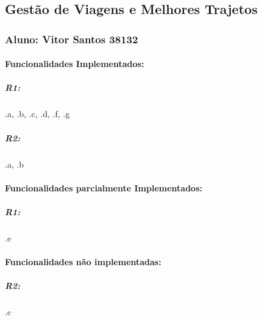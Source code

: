 \subsection*{Gestão de Viagens e Melhores Trajetos}

\subsubsection*{Aluno\+: Vitor Santos 38132}

\paragraph*{Funcionalidades Implementados\+:}

\subparagraph*{R1\+:}

.a, .b, .c, .d, .f, .g \subparagraph*{R2\+:}

.a, .b

\paragraph*{Funcionalidades parcialmente Implementados\+:}

\subparagraph*{R1\+:}

.e

\paragraph*{Funcionalidades não implementadas\+:}

\subparagraph*{R2\+:}

.c 